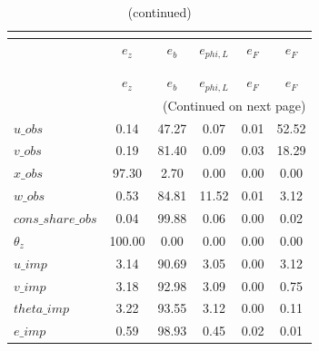  
\begin{center}
\begin{longtable}{lccccc} 
\caption{VARIANCE DECOMPOSITION (in percent)}\\
 \label{Table:th_var_decomp_uncond}\\
\toprule 
$                   $	 & 	 $          {e_z}$	 & 	 $        {e_{b}}$	 & 	 $    {e_{phi,L}}$	 & 	 $          {e_F}$	 & 	 $          {e_F}$\\
\midrule \endfirsthead 
\caption{(continued)}\\
 \toprule \\ 
$                   $	 & 	 $          {e_z}$	 & 	 $        {e_{b}}$	 & 	 $    {e_{phi,L}}$	 & 	 $          {e_F}$	 & 	 $          {e_F}$\\
\midrule \endhead 
\midrule \multicolumn{6}{r}{(Continued on next page)} \\ \bottomrule \endfoot 
\bottomrule \endlastfoot 
$u\_obs             $	 & 	           0.14	 & 	          47.27	 & 	           0.07	 & 	           0.01	 & 	          52.52 \\ 
$v\_obs             $	 & 	           0.19	 & 	          81.40	 & 	           0.09	 & 	           0.03	 & 	          18.29 \\ 
$x\_obs             $	 & 	          97.30	 & 	           2.70	 & 	           0.00	 & 	           0.00	 & 	           0.00 \\ 
$w\_obs             $	 & 	           0.53	 & 	          84.81	 & 	          11.52	 & 	           0.01	 & 	           3.12 \\ 
$cons\_share\_obs   $	 & 	           0.04	 & 	          99.88	 & 	           0.06	 & 	           0.00	 & 	           0.02 \\ 
${\theta_z}         $	 & 	         100.00	 & 	           0.00	 & 	           0.00	 & 	           0.00	 & 	           0.00 \\ 
$u\_imp             $	 & 	           3.14	 & 	          90.69	 & 	           3.05	 & 	           0.00	 & 	           3.12 \\ 
$v\_imp             $	 & 	           3.18	 & 	          92.98	 & 	           3.09	 & 	           0.00	 & 	           0.75 \\ 
$theta\_imp         $	 & 	           3.22	 & 	          93.55	 & 	           3.12	 & 	           0.00	 & 	           0.11 \\ 
$e\_imp             $	 & 	           0.59	 & 	          98.93	 & 	           0.45	 & 	           0.02	 & 	           0.01 \\ 

\end{longtable}
\end{center}

